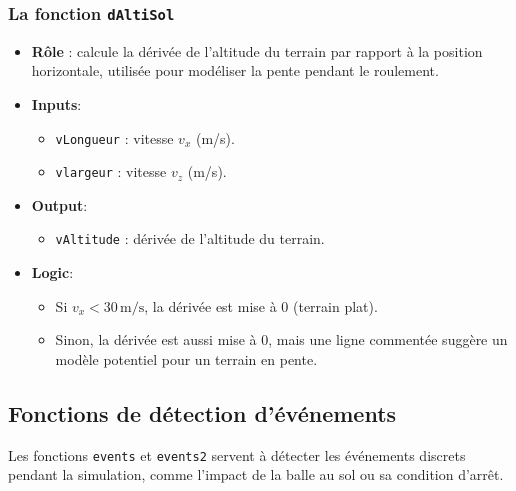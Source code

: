 \documentclass[10pt,a4paper]{report}
\begin{document}
\subsubsection{La fonction \texttt{dAltiSol}}
\begin{itemize}
    \item \textbf{Rôle} : calcule la dérivée de l'altitude du terrain par rapport à la position horizontale, utilisée pour modéliser la pente pendant le roulement.
    \item \textbf{Inputs}:
    \begin{itemize}
        \item \texttt{vLongueur} : vitesse \(v_x\) (m/s).
        \item \texttt{vlargeur} : vitesse \(v_z\) (m/s).
    \end{itemize}
    \item \textbf{Output}:
    \begin{itemize}
        \item \texttt{vAltitude} : dérivée de l'altitude du terrain.
    \end{itemize}
    \item \textbf{Logic}:
    \begin{itemize}
        \item Si \(v_x < 30 \, \text{m/s}\), la dérivée est mise à \(0\) (terrain plat).
        \item Sinon, la dérivée est aussi mise à \(0\), mais une ligne commentée suggère un modèle potentiel pour un terrain en pente.
    \end{itemize}
\end{itemize}

\bigskip
\subsection{Fonctions de détection d'événements}
\label{subsec:event_functions}

Les fonctions \texttt{events} et \texttt{events2} servent à détecter les événements discrets pendant la simulation, comme l'impact de la balle au sol ou sa condition d'arrêt.
\end{document}
